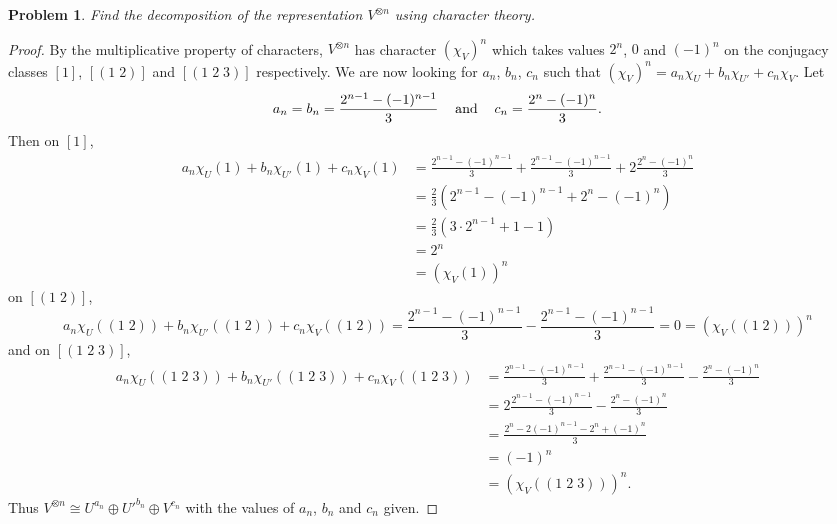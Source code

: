 \documentclass{article}
\newtheorem{problem}{Problem}
\begin{document}
\begin{problem}
Find the decomposition of the representation $V^{\otimes n}$ using character theory.
\end{problem}
\begin{proof}
By the multiplicative property of characters, $V^{\otimes n}$ has character $(\chi_V)^n$ which takes values $2^n$, $0$ and $(-1)^n$ on the conjugacy classes $[1]$, $[(1 \; 2)]$ and $[(1 \; 2 \; 3)]$ respectively. We are now looking for $a_n$, $b_n$, $c_n$ such that $(\chi_V)^n = a_n \chi_U + b_n \chi_{U'} + c_n \chi_V$. Let
\[
\begin{tabular}{ccc}
$\displaystyle{a_n = b_n = \frac{2^{n-1} - (-1)^{n-1}}{3}}$ & and & $\displaystyle{c_n = \frac{2^n - (-1)^n}{3}}$.
\end{tabular}
\]
Then on $[1]$,
\begin{align*}
a_n \chi_U(1) + b_n \chi_{U'}(1) + c_n \chi_V(1)
&= \frac{2^{n-1} - (-1)^{n-1}}{3} + \frac{2^{n-1} - (-1)^{n-1}}{3} + 2 \frac{2^n - (-1)^n}{3}\\
&= \frac{2}{3} (2^{n-1} - (-1)^{n-1} + 2^n - (-1)^n)\\
&= \frac{2}{3} (3 \cdot 2^{n-1} + 1 - 1)\\
&= 2^n\\
&= (\chi_V(1))^n
\end{align*}
on $[(1 \; 2)]$,
\[
a_n \chi_U((1 \; 2)) + b_n \chi_{U'}((1 \; 2)) + c_n \chi_V((1 \; 2)) = \frac{2^{n-1} - (-1)^{n-1}}{3} - \frac{2^{n-1} - (-1)^{n-1}}{3} = 0 = (\chi_V((1 \; 2)))^n
\]
and on $[(1 \; 2 \; 3)]$,
\begin{align*}
a_n \chi_U((1 \; 2 \; 3)) + b_n \chi_{U'}((1 \; 2 \; 3)) + c_n \chi_V((1 \; 2 \; 3))
&= \frac{2^{n-1} - (-1)^{n-1}}{3} + \frac{2^{n-1} - (-1)^{n-1}}{3} - \frac{2^n - (-1)^n}{3}\\
&= 2 \frac{2^{n-1} - (-1)^{n-1}}{3} - \frac{2^n - (-1)^n}{3}\\
&= \frac{2^n - 2(-1)^{n-1} - 2^n + (-1)^n}{3}\\
&= (-1)^n\\
&= (\chi_V((1 \; 2 \; 3)))^n.
\end{align*}
Thus $V^{\otimes n} \cong U^{a_n} \oplus U'^{b_n} \oplus V^{c_n}$ with the values of $a_n$, $b_n$ and $c_n$ given.
\end{proof}
\end{document}
